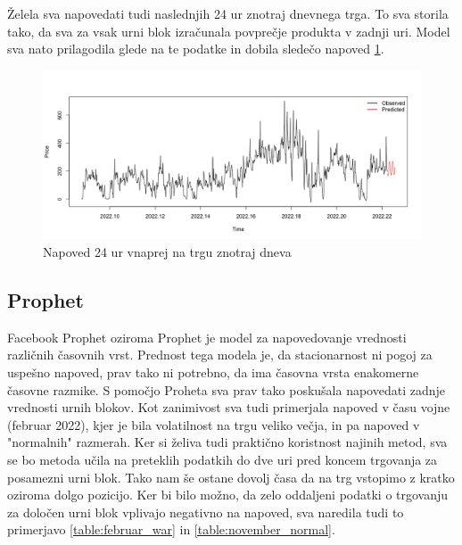 \documentclass[12pt,a4paper]{amsart}
\theoremstyle{definition} %
\theoremstyle{plain} %
\begin{document}
Želela sva napovedati tudi naslednjih 24 ur znotraj dnevnega trga. To sva storila tako, da sva za vsak urni blok izračunala povprečje produkta v zadnji uri. Model sva nato prilagodila glede na te podatke in dobila sledečo napoved 
\ref{fig:Prediction_intraday}.

\begin{figure}[h]
    \centering
    \includegraphics[scale=0.35]{Prediciton_intraday.png}
    \caption{Napoved 24 ur vnaprej na trgu znotraj dneva}
    \label{fig:Prediction_intraday}
\end{figure}



\subsection{Prophet}

Facebook Prophet oziroma Prophet je model za napovedovanje vrednosti različnih časovnih vrst. Prednost tega modela je, da stacionarnost ni pogoj za uspešno napoved, prav tako ni potrebno, da ima časovna vrsta enakomerne časovne razmike.
S pomočjo Proheta sva prav tako poskušala napovedati zadnje vrednosti urnih blokov. Kot zanimivost sva tudi primerjala napoved v času vojne (februar 2022), kjer je bila volatilnost na trgu veliko večja, in pa napoved v "normalnih" razmerah.
Ker si želiva tudi praktično koristnost najinih metod, sva se bo metoda učila na preteklih podatkih do dve uri pred koncem trgovanja za posamezni urni blok. Tako nam še ostane dovolj časa da na trg vstopimo z kratko oziroma dolgo pozicijo.
Ker bi bilo možno, da zelo oddaljeni podatki o trgovanju za določen urni blok vplivajo negativno na napoved, sva naredila tudi to primerjavo \ref{table:februar_war} in \ref{table:november_normal}. %
\end{document}
